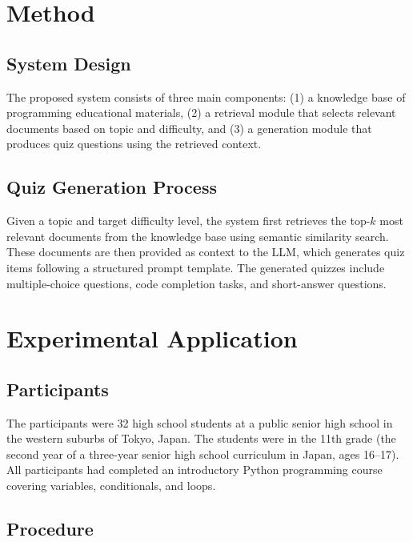 \documentclass[11pt,a4paper]{article}
\begin{document}
\section{Method}

\subsection{System Design}

The proposed system consists of three main components: (1) a knowledge base of programming educational materials, (2) a retrieval module that selects relevant documents based on topic and difficulty, and (3) a generation module that produces quiz questions using the retrieved context.

\subsection{Quiz Generation Process}

Given a topic and target difficulty level, the system first retrieves the top-$k$ most relevant documents from the knowledge base using semantic similarity search. These documents are then provided as context to the LLM, which generates quiz items following a structured prompt template. The generated quizzes include multiple-choice questions, code completion tasks, and short-answer questions.


\section{Experimental Application}

\subsection{Participants}

The participants were 32 high school students at a public senior high school in the western suburbs of Tokyo, Japan. The students were in the 11th grade (the second year of a three-year senior high school curriculum in Japan, ages 16--17). All participants had completed an introductory Python programming course covering variables, conditionals, and loops.

\subsection{Procedure}
\end{document}
